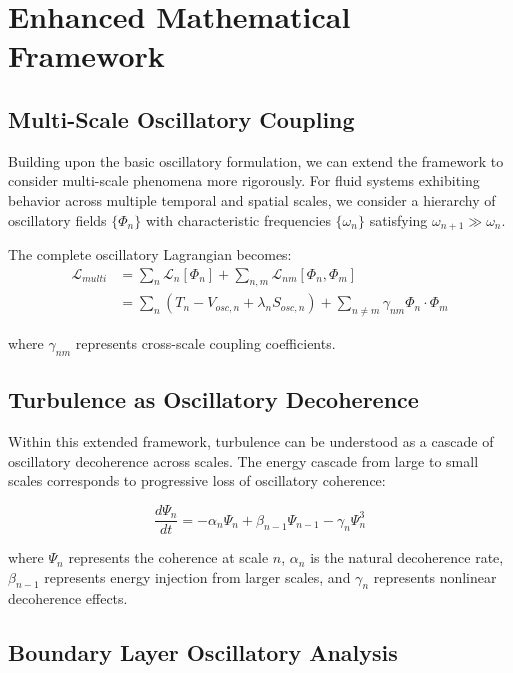 \documentclass[12pt,a4paper]{article}
\begin{document}
\section{Enhanced Mathematical Framework}

\subsection{Multi-Scale Oscillatory Coupling}

Building upon the basic oscillatory formulation, we can extend the framework to consider multi-scale phenomena more rigorously. For fluid systems exhibiting behavior across multiple temporal and spatial scales, we consider a hierarchy of oscillatory fields $\{\Phi_n\}$ with characteristic frequencies $\{\omega_n\}$ satisfying $\omega_{n+1} \gg \omega_n$.

The complete oscillatory Lagrangian becomes:
\begin{align}
\mathcal{L}_{multi} &= \sum_n \mathcal{L}_n[\Phi_n] + \sum_{n,m} \mathcal{L}_{nm}[\Phi_n, \Phi_m] \\
&= \sum_n \left(T_n - V_{osc,n} + \lambda_n S_{osc,n}\right) + \sum_{n \neq m} \gamma_{nm} \Phi_n \cdot \Phi_m
\end{align}

where $\gamma_{nm}$ represents cross-scale coupling coefficients.

\subsection{Turbulence as Oscillatory Decoherence}

Within this extended framework, turbulence can be understood as a cascade of oscillatory decoherence across scales. The energy cascade from large to small scales corresponds to progressive loss of oscillatory coherence:

\begin{equation}
\frac{d\Psi_n}{dt} = -\alpha_n \Psi_n + \beta_{n-1} \Psi_{n-1} - \gamma_n \Psi_n^3
\end{equation}

where $\Psi_n$ represents the coherence at scale $n$, $\alpha_n$ is the natural decoherence rate, $\beta_{n-1}$ represents energy injection from larger scales, and $\gamma_n$ represents nonlinear decoherence effects.

\subsection{Boundary Layer Oscillatory Analysis}
\end{document}
